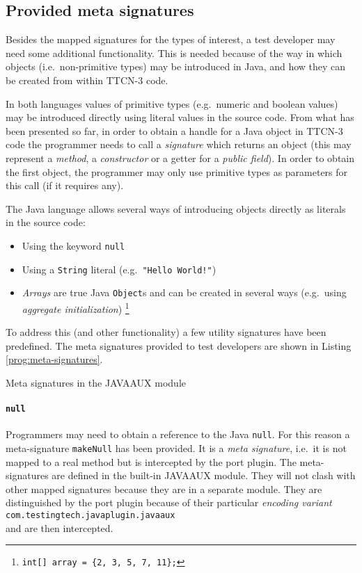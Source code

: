 \subsection{Provided meta signatures}

Besides the mapped signatures for the types of interest,
a test developer may need some additional functionality.
This is needed because of the way in which objects (i.e.\ non-primitive types)
may be introduced in Java,
and how they can be created from within \ac{TTCN-3} code.

In both languages values of primitive types (e.g.\ numeric and boolean values)
may be introduced directly using literal values in the source code.
From what has been presented so far,
in order to obtain a handle for a Java object in \ac{TTCN-3} code
the programmer needs to call a \emph{signature} which returns an object
(this may represent a \emph{method}, a \emph{constructor}
or a getter for a \emph{public field}).
In order to obtain the first object, the programmer
may only use primitive types as parameters for this call (if it requires any).

The Java language allows several ways
of introducing objects directly as literals in the source code:
\begin{itemize}
\item Using the keyword \verb=null=
\item Using a \verb=String= literal (e.g.\ \verb="Hello World!"=)
\item \emph{Arrays} are true Java \verb=Object=s
and can be created in several ways
(e.g.\ using \emph{aggregate initialization})%
	\footnote{\texttt{int[] array = \{2, 3, 5, 7, 11\};}}
\end{itemize}

To address this (and other functionality)
a few utility signatures have been predefined.
The meta signatures provided to test developers are shown
in Listing \ref{prog:meta-signatures}.

\begin{program}
\caption{Meta signatures in the JAVAAUX module\label{prog:meta-signatures}}
\end{program}

\paragraph{\texttt{null}}
Programmers may need to obtain a reference to the Java \verb=null=.
For this reason a meta-signature \verb=makeNull= has been provided.
It is a \emph{meta signature}, i.e.\ it is not mapped to a real method
but is intercepted by the port plugin.
The meta-signatures are defined in the built-in JAVAAUX module.
They will not clash with other mapped signatures
because they are in a separate module.
They are distinguished by the port plugin because of their particular
\emph{encoding variant}\\
\verb=com.testingtech.javaplugin.javaaux=\\
and are then intercepted.

